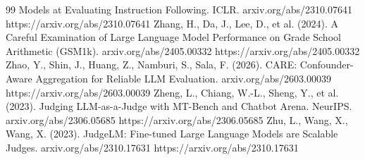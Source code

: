 \begin{thebibliography}{99}
    Models at Evaluating Instruction Following. ICLR. arxiv.org/abs/2310.07641 https://arxiv.org/abs/2310.07641
\label{r12} Zhang, H., Da, J., Lee, D., et al. (2024). A Careful Examination of Large Language Model Performance on
    Grade School Arithmetic (GSM1k). arxiv.org/abs/2405.00332 https://arxiv.org/abs/2405.00332
\label{r28} Zhao, Y., Shin, J., Huang, Z., Namburi, S., Sala, F. (2026). CARE: Confounder-Aware Aggregation
    for Reliable LLM Evaluation. arxiv.org/abs/2603.00039 https://arxiv.org/abs/2603.00039
\label{r1} Zheng, L., Chiang, W.-L., Sheng, Y., et al. (2023). Judging LLM-as-a-Judge with MT-Bench and Chatbot
    Arena. NeurIPS. arxiv.org/abs/2306.05685 https://arxiv.org/abs/2306.05685
\label{r35} Zhu, L., Wang, X., Wang, X. (2023). JudgeLM: Fine-tuned Large Language Models are Scalable
    Judges. arxiv.org/abs/2310.17631 https://arxiv.org/abs/2310.17631
\end{thebibliography}